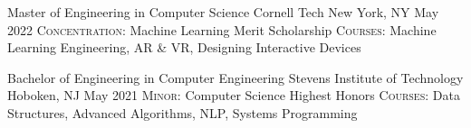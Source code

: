 

\begin{cventries}

  \cventry
  {Master of Engineering in Computer Science} %
  {Cornell Tech} %
  {New York, NY} %
  {May 2022} %
  {
  \textsc{Concentration:} Machine Learning {\enskip\cdotp\enskip}
  Merit Scholarship {\enskip\cdotp\enskip}
  \textsc{Courses:} Machine Learning Engineering, AR \& VR, Designing Interactive Devices
  }

  \cventry
  {Bachelor of Engineering in Computer Engineering} %
  {Stevens Institute of Technology} %
  {Hoboken, NJ} %
  {May 2021} %
  {
    \textsc{Minor:} Computer Science {\enskip\cdotp\enskip}
    Highest Honors {\enskip\cdotp\enskip}
    \textsc{Courses:} Data Structures, Advanced Algorithms, NLP, Systems Programming
  }

\end{cventries}

